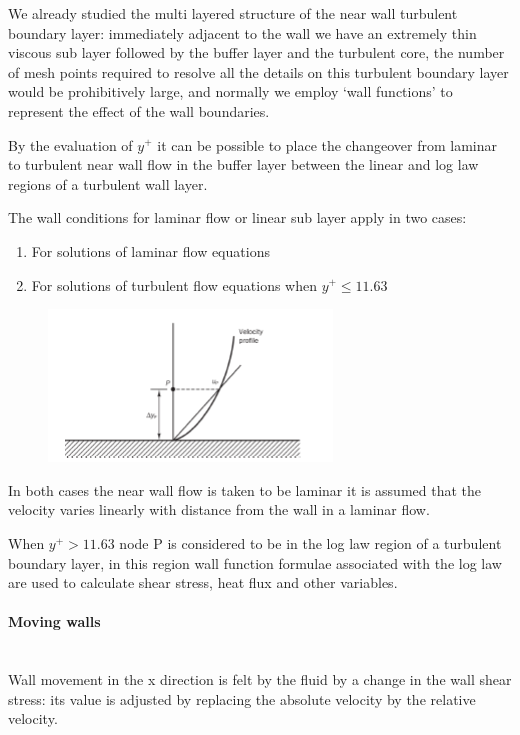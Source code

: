 \documentclass[a4paper, 15pt]{article}
\begin{document}
We
already studied the multi layered structure of the near wall turbulent boundary layer:
immediately adjacent to the wall we have an extremely thin viscous sub layer followed by the
buffer layer and the turbulent core, the number of mesh points required to resolve all the details on this turbulent boundary layer
would be prohibitively large, and normally we employ ‘wall functions’ to represent the effect of
the wall boundaries. \newline 

By the evaluation of $y^+$ it can be possible to place the changeover from laminar to turbulent near wall flow in the buffer layer
between the linear and log law regions of a turbulent wall layer. \newline 

The
wall conditions for laminar flow or linear sub layer apply in two cases:
\begin{enumerate}
	\item For solutions of 
	laminar flow equations
	\item For solutions of turbulent flow equations when $y^+\leq 11.63$
\end{enumerate}   
\begin{figure}[H]
	\centering
	\label{fig:screenshot031}
	\includegraphics[width=0.5\linewidth]{fig/screenshot031}
\end{figure}
In
both cases the near wall flow is taken to be laminar it is assumed that the velocity varies
linearly with distance from the wall in a laminar flow. \newline 

When $y^+> 11.63$ node P is considered to be in the log law region of a
turbulent boundary layer, in
this region wall function formulae associated with the log law are used to calculate shear
stress, heat flux and other variables. 

\paragraph*{Moving walls} \mbox{} \\
Wall
movement in the x direction is felt by the fluid by a change in the wall shear stress: its value
is adjusted by replacing the absolute velocity by the relative velocity.
\end{document}
